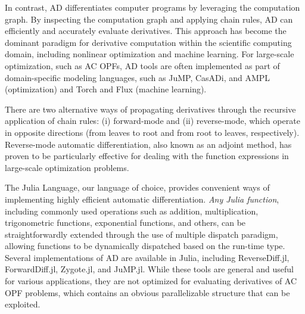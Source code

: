 In contrast, AD differentiates computer
programs by leveraging the computation graph. By inspecting the
computation graph and applying chain rules, AD
can efficiently and accurately evaluate derivatives. This approach has
become the dominant paradigm for derivative computation within the
scientific computing domain, including nonlinear optimization and
machine learning. For large-scale optimization, such as AC OPFs, AD
tools are often implemented as part of domain-specific modeling
languages, such as JuMP, CasADi, and AMPL (optimization) and Torch and
Flux (machine learning).

There are two alternative ways of propagating derivatives through the
recursive application of chain rules: (i) forward-mode and (ii)
reverse-mode, which operate in opposite directions (from leaves to
root and from root to leaves, respectively). Reverse-mode automatic
differentiation, also known as an adjoint method, has proven to be
particularly effective for dealing with the function expressions in
large-scale optimization problems.

The Julia Language, our language of choice, provides convenient ways
of implementing highly efficient automatic
differentiation. \textit{Any Julia function}, including commonly used
operations such as addition, multiplication, trigonometric functions,
exponential functions, and others, can be straightforwardly extended
through the use of multiple dispatch paradigm, allowing functions to
be dynamically dispatched based on the run-time type. Several
implementations of AD are available in Julia, including
ReverseDiff.jl, ForwardDiff.jl, Zygote.jl, and JuMP.jl. While these
tools are general and useful for various applications, they are not
optimized for evaluating derivatives of AC OPF problems, which contains
an obvious parallelizable structure that can be exploited.


